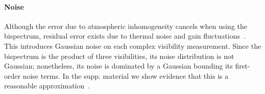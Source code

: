 {{\paragraph{Noise} Although the error due to atmospheric inhomogeneity cancels when using the bispectrum, residual error exists due to thermal noise and gain fluctuations~\cite{thompson2008interferometry}. This introduces Gaussian noise on each complex visibility measurement. Since the bispectrum is the product of three visibilities, its noise distribution is not Gaussian; nonetheless, its noise is dominated by a Gaussian bounding its first-order noise terms. In the supp. material we show evidence that this is a reasonable approximation~\cite{suppmaterial}. 





}}
